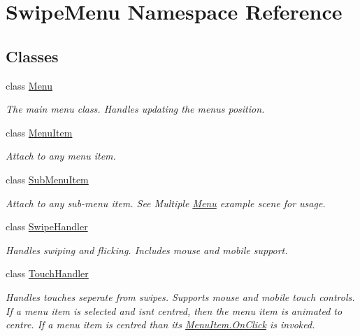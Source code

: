 \hypertarget{namespace_swipe_menu}{}\section{Swipe\+Menu Namespace Reference}
\label{namespace_swipe_menu}
\subsection*{Classes}
\begin{DoxyCompactItemize}
\item 
class \hyperlink{class_swipe_menu_1_1_menu}{Menu}
\begin{DoxyCompactList}\small\item\em The main menu class. Handles updating the menus position. \end{DoxyCompactList}\item 
class \hyperlink{class_swipe_menu_1_1_menu_item}{Menu\+Item}
\begin{DoxyCompactList}\small\item\em Attach to any menu item. \end{DoxyCompactList}\item 
class \hyperlink{class_swipe_menu_1_1_sub_menu_item}{Sub\+Menu\+Item}
\begin{DoxyCompactList}\small\item\em Attach to any sub-\/menu item. See Multiple \hyperlink{class_swipe_menu_1_1_menu}{Menu} example scene for usage. \end{DoxyCompactList}\item 
class \hyperlink{class_swipe_menu_1_1_swipe_handler}{Swipe\+Handler}
\begin{DoxyCompactList}\small\item\em Handles swiping and flicking. Includes mouse and mobile support. \end{DoxyCompactList}\item 
class \hyperlink{class_swipe_menu_1_1_touch_handler}{Touch\+Handler}
\begin{DoxyCompactList}\small\item\em Handles touches seperate from swipes. Supports mouse and mobile touch controls. If a menu item is selected and isn\textquotesingle{}t centred, then the menu item is animated to centre. If a menu item is centred than its \hyperlink{class_swipe_menu_1_1_menu_item_ad4e6de7e233b0bbce78a6451dcf96cfe}{Menu\+Item.\+On\+Click} is invoked. \end{DoxyCompactList}\end{DoxyCompactItemize}
